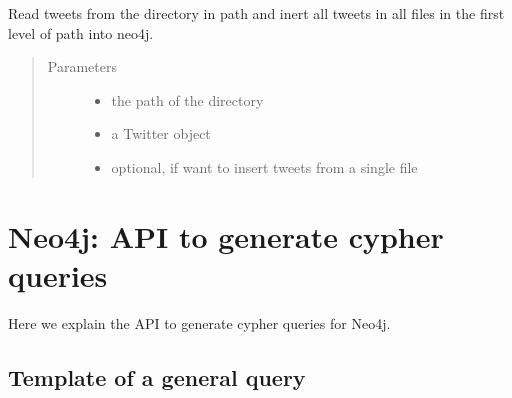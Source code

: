 \documentclass[letterpaper,10pt,english]{sphinxmanual}
\begin{document}
\begin{fulllineitems}
\label{\detokenize{mongoDB_data_ingestion:ingest_raw.read_tweets}}
Read tweets from the directory in path and inert all tweets in all files in the first level of path into
neo4j.
\begin{quote}\begin{description}
\item[{Parameters}] \leavevmode\begin{itemize}
\item {} 
 \textendash{} the path of the directory

\item {} 
 \textendash{} a Twitter object

\item {} 
 \textendash{} optional, if want to insert tweets from a single file

\end{itemize}

\end{description}\end{quote}

\end{fulllineitems}


\begin{fulllineitems}
\label{\detokenize{mongoDB_data_ingestion:ingest_raw.threaded}}
\end{fulllineitems}



\chapter{Neo4j: API to generate cypher queries}
\label{\detokenize{neo4j_query_generation:neo4j-api-to-generate-cypher-queries}}\label{\detokenize{neo4j_query_generation::doc}}
Here we explain the API to generate cypher queries for Neo4j.


\section{Template of a general query}
\label{\detokenize{neo4j_query_generation:template-of-a-general-query}}
\end{document}
